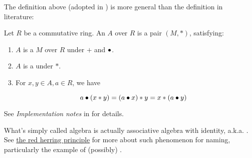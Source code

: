 \begin{remark}
    \label{mk:AlgebraNotation}


\end{remark}

\begin{remark}
    \label{mk:AlgebraLiterature}

    The definition above (adopted in \Mathlib) is more general than the definition in literature:

    Let $R$ be a commutative ring. An  $A$ over $R$ is a pair $(M, *)$, satisfying:

    \begin{enumerate}
    \item $A$ is a  $M$ over $R$ under $+$ and $\bullet$.

    \item $A$ is a  under $*$.

    \item For $x, y \in A, a \in R$, we have
    
    $$
    a \bullet (x * y) = (a \bullet x) * y = x * (a \bullet y)
    $$

    \end{enumerate}

    See \emph{Implementation notes} in  for details.
    
\end{remark}

\begin{remark}
    \label{mk:AlgebraName}

    What's simply called algebra is actually associative algebra with identity, a.k.a. . See
    \href{https://ncatlab.org/nlab/show/red%20herring%20principle}{the red herring principle}
    for more about such phenomenon for naming, particularly the example of (possibly) .
    
\end{remark}


